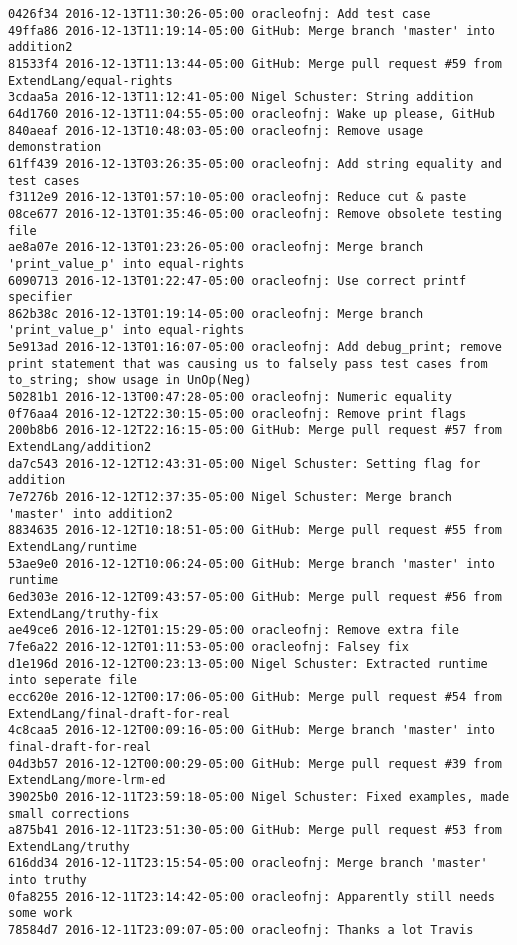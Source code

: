 \begin{lstlisting}
0426f34 2016-12-13T11:30:26-05:00 oracleofnj: Add test case
49ffa86 2016-12-13T11:19:14-05:00 GitHub: Merge branch 'master' into addition2
81533f4 2016-12-13T11:13:44-05:00 GitHub: Merge pull request #59 from ExtendLang/equal-rights
3cdaa5a 2016-12-13T11:12:41-05:00 Nigel Schuster: String addition
64d1760 2016-12-13T11:04:55-05:00 oracleofnj: Wake up please, GitHub
840aeaf 2016-12-13T10:48:03-05:00 oracleofnj: Remove usage demonstration
61ff439 2016-12-13T03:26:35-05:00 oracleofnj: Add string equality and test cases
f3112e9 2016-12-13T01:57:10-05:00 oracleofnj: Reduce cut & paste
08ce677 2016-12-13T01:35:46-05:00 oracleofnj: Remove obsolete testing file
ae8a07e 2016-12-13T01:23:26-05:00 oracleofnj: Merge branch 'print_value_p' into equal-rights
6090713 2016-12-13T01:22:47-05:00 oracleofnj: Use correct printf specifier
862b38c 2016-12-13T01:19:14-05:00 oracleofnj: Merge branch 'print_value_p' into equal-rights
5e913ad 2016-12-13T01:16:07-05:00 oracleofnj: Add debug_print; remove print statement that was causing us to falsely pass test cases from to_string; show usage in UnOp(Neg)
50281b1 2016-12-13T00:47:28-05:00 oracleofnj: Numeric equality
0f76aa4 2016-12-12T22:30:15-05:00 oracleofnj: Remove print flags
200b8b6 2016-12-12T22:16:15-05:00 GitHub: Merge pull request #57 from ExtendLang/addition2
da7c543 2016-12-12T12:43:31-05:00 Nigel Schuster: Setting flag for addition
7e7276b 2016-12-12T12:37:35-05:00 Nigel Schuster: Merge branch 'master' into addition2
8834635 2016-12-12T10:18:51-05:00 GitHub: Merge pull request #55 from ExtendLang/runtime
53ae9e0 2016-12-12T10:06:24-05:00 GitHub: Merge branch 'master' into runtime
6ed303e 2016-12-12T09:43:57-05:00 GitHub: Merge pull request #56 from ExtendLang/truthy-fix
ae49ce6 2016-12-12T01:15:29-05:00 oracleofnj: Remove extra file
7fe6a22 2016-12-12T01:11:53-05:00 oracleofnj: Falsey fix
d1e196d 2016-12-12T00:23:13-05:00 Nigel Schuster: Extracted runtime into seperate file
ecc620e 2016-12-12T00:17:06-05:00 GitHub: Merge pull request #54 from ExtendLang/final-draft-for-real
4c8caa5 2016-12-12T00:09:16-05:00 GitHub: Merge branch 'master' into final-draft-for-real
04d3b57 2016-12-12T00:00:29-05:00 GitHub: Merge pull request #39 from ExtendLang/more-lrm-ed
39025b0 2016-12-11T23:59:18-05:00 Nigel Schuster: Fixed examples, made small corrections
a875b41 2016-12-11T23:51:30-05:00 GitHub: Merge pull request #53 from ExtendLang/truthy
616dd34 2016-12-11T23:15:54-05:00 oracleofnj: Merge branch 'master' into truthy
0fa8255 2016-12-11T23:14:42-05:00 oracleofnj: Apparently still needs some work
78584d7 2016-12-11T23:09:07-05:00 oracleofnj: Thanks a lot Travis

\end{lstlisting}
